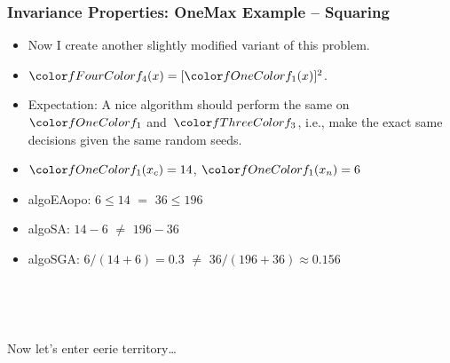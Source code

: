 \documentclass[aspectratio=169,mathserif,notheorems]{beamer}%
\begin{document}
\begin{frame}%
\frametitle{Invariance Properties: OneMax Example -- Squaring}%
\parbox{0.415\paperwidth}{%
\begin{itemize}%
\item Now I create another slightly modified variant of this problem.%
\item<2-> $\fn{4}(x)=[\fn{1}(x)]^2$.%
\item<3-> Expectation: A nice algorithm should perform the same on~$\fn{1}$ and~$\fn{3}$, i.e., make the exact same decisions given the same random seeds.%
%
\item<4-> $\fn{1}(x_c)=14$, $\fn{1}(x_n)=6$%
%
\item<6-> \gls{algoEAopo}: $6\leq14$ \textcolor{greenYesColor}{$\mathbf{=}$} $36\leq196$ \greenYes%
%
\item<7-> \gls{algoSA}: $14-6$ \textcolor{redNoColor}{$\mathbf{\neq}$} $196-36$ \redNo%
%
\item<8-> \gls{algoSGA}: $6/(14+6)=0.3$ \textcolor{redNoColor}{$\mathbf{\neq}$} $36/(196+36)\approx0.156$ \redNo%
\end{itemize}%
}%
%
%
%
%
%
%
%
\end{frame}%
%
\begin{frame}%
\centering%
\strut\\\strut\vfill\strut\\\strut%
{\large{Now let's enter eerie territory\dots}}%
\strut\\\strut\vfill\strut\\\strut%
\end{frame}%
%
\end{document}
